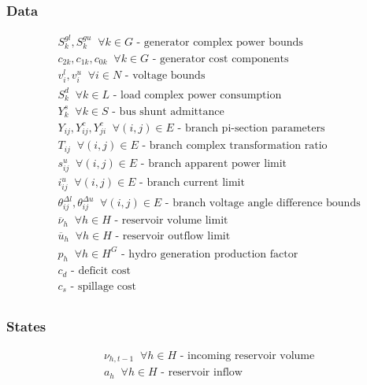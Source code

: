\documentclass{juliacon}
\begin{document}
\subsubsection*{Data}
\begin{align*}
%
& S^{gl}_k, S^{gu}_k \;\; \forall k \in G \nonumber \mbox{ - generator complex power bounds}\\
& c_{2k}, c_{1k}, c_{0k} \;\; \forall k \in G \nonumber  \mbox{ - generator cost components}\\
& v^l_i, v^u_i \;\; \forall i \in N \nonumber \mbox{ - voltage bounds}\\
& S^d_k \;\; \forall k \in L \nonumber \mbox{ - load complex power consumption}\\
& Y^s_{k} \;\; \forall k \in S \nonumber \mbox{ - bus shunt admittance}\\
& Y_{ij}, Y^c_{ij}, Y^c_{ji} \;\; \forall (i,j) \in E \nonumber \mbox{ - branch pi-section parameters}\\
& {T}_{ij} \;\; \forall (i,j) \in E \nonumber \mbox{ - branch complex transformation ratio}\\
& s^u_{ij}  \;\; \forall (i,j) \in E \nonumber \mbox{ - branch apparent power limit}\\
& i^u_{ij}  \;\; \forall (i,j) \in E \nonumber \mbox{ - branch current limit}\\
& \theta^{\Delta l}_{ij}, \theta^{\Delta u}_{ij} \;\; \forall (i,j) \in E \nonumber \mbox{ - branch voltage angle difference bounds}\\
& \overline{\nu}_h  \;\; \forall h \in H \nonumber \mbox{ - reservoir volume limit}\\
& \overline{u}_h  \;\; \forall h \in H \nonumber \mbox{ - reservoir outflow limit}\\
& p_h  \;\; \forall h \in H^G \nonumber \mbox{ - hydro generation production factor}\\
& c_{d} \nonumber \mbox{ - deficit cost}\\
& c_{s} \nonumber \mbox{ - spillage cost}\\
%
\end{align*}

\subsubsection*{States}
\begin{align*}
%
& \nu_{h,t-1}  \;\; \forall h \in H \nonumber \mbox{ - incoming reservoir volume}\\
& a_{h}  \;\; \forall h \in H \nonumber \mbox{ - reservoir inflow}\\
%
\end{align*}
\end{document}
